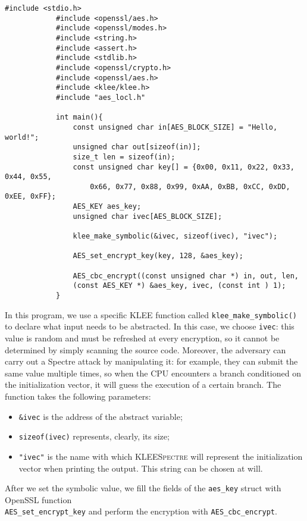 \documentclass[target=mst,aauheader=aics]{thud}
\theoremstyle{definition}
\begin{document}
	\begin{minipage}{\textwidth}
		\begin{lstlisting}[caption=\texttt{testing\_AES\_CBC.c}, label=test-aes-cbc]
			#include <stdio.h>
			#include <openssl/aes.h>
			#include <openssl/modes.h>
			#include <string.h>
			#include <assert.h>
			#include <stdlib.h>
			#include <openssl/crypto.h>
			#include <openssl/aes.h>
			#include <klee/klee.h>
			#include "aes_locl.h"
			
			int main(){
				const unsigned char in[AES_BLOCK_SIZE] = "Hello, world!";
				unsigned char out[sizeof(in)];
				size_t len = sizeof(in);
				const unsigned char key[] = {0x00, 0x11, 0x22, 0x33, 0x44, 0x55,
					0x66, 0x77, 0x88, 0x99, 0xAA, 0xBB, 0xCC, 0xDD, 0xEE, 0xFF};
				AES_KEY aes_key;
				unsigned char ivec[AES_BLOCK_SIZE];	
				
				klee_make_symbolic(&ivec, sizeof(ivec), "ivec");
				
				AES_set_encrypt_key(key, 128, &aes_key);
				
				AES_cbc_encrypt((const unsigned char *) in, out, len, 
				(const AES_KEY *) &aes_key, ivec, (const int ) 1);
			}
		\end{lstlisting}
	\end{minipage}
	\vspace{3mm}
	
	In this program, we use a specific \textsc{KLEE} function called \texttt{klee\_make\_symbolic()} to declare what input needs to be abstracted. In this case, we choose \texttt{ivec}: this value is random and must be refreshed at every encryption, so it cannot be determined by simply scanning the source code. Moreover, the adversary can carry out a Spectre attack by manipulating it: for example, they can submit the same value multiple times, so when the CPU encounters a branch conditioned on the initialization vector, it will guess the execution of a certain branch. The function takes the following parameters:
	\begin{itemize}
		\item \texttt{\&ivec} is the address of the abstract variable;
		\item \texttt{sizeof(ivec)} represents, clearly, its size;
		\item \texttt{"ivec"} is the name with which \textsc{KLEESpectre} will represent the initialization vector when printing the output. This string can be chosen at will.
	\end{itemize}
	After we set the symbolic value, we fill the fields of the \texttt{aes\_key} struct with OpenSSL function\\ \texttt{AES\_set\_encrypt\_key} and perform the encryption with \texttt{AES\_cbc\_encrypt}.
	
\end{document}
